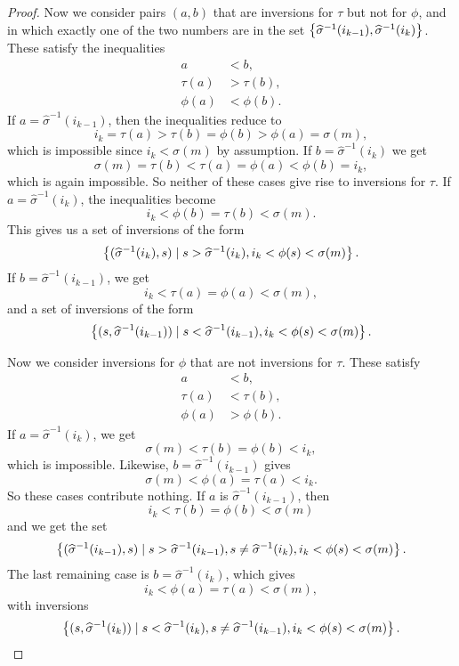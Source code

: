\begin{proof}
  Now we consider
  pairs $(a,b)$ that are inversions for $\tau$ but not for $\phi$, and
  in which exactly one of the two numbers are in the set
  $\left\{ \widehat{\sigma}^{-1}(i_{k-1}),\widehat{\sigma}^{-1}(i_{k}) \right\}$.
  These satisfy the inequalities
  \begin{align*}
    a &< b, \\
    \tau(a) &> \tau(b), \\
    \phi(a) &< \phi(b).
  \end{align*}
  If $a = \widehat{\sigma}^{-1}(i_{k-1})$, then the inequalities
  reduce to
  \[ i_k = \tau(a) > \tau(b) = \phi(b) > \phi(a) = \sigma(m), \]
  which is impossible since $i_k < \sigma(m)$ by assumption.
  If $b = \widehat{\sigma}^{-1}(i_{k})$ we get
  \[ \sigma(m) = \tau(b) < \tau(a) = \phi(a) < \phi(b) = i_k, \]
  which is again impossible. So neither of these cases give rise to
  inversions for $\tau$.
  If $a = \widehat{\sigma}^{-1}(i_{k})$, the inequalities become
  \[ i_k < \phi(b) = \tau(b) < \sigma(m). \]
  This gives us a set of inversions of the form
  \[ \left\{ (\widehat{\sigma}^{-1}(i_{k}),s) \mid s >
    \widehat{\sigma}^{-1}(i_{k}), i_k < \phi(s) < \sigma(m) \right\}. \]
  If $b = \widehat{\sigma}^{-1}(i_{k-1})$, we get
  \[ i_k < \tau(a) = \phi(a) < \sigma(m), \]
  and a set of inversions of the form
  \[ \left\{ (s,\widehat{\sigma}^{-1}(i_{k-1})) \mid s <
    \widehat{\sigma}^{-1}(i_{k-1}), i_k < \phi(s) < \sigma(m) \right\}. \]

  Now we consider inversions for $\phi$ that are not inversions for
  $\tau$. These satisfy
  \begin{align*}
    a &< b, \\
    \tau(a) &< \tau(b), \\
    \phi(a) &> \phi(b).
  \end{align*}
  If $a = \widehat{\sigma}^{-1}(i_{k})$, we get
  \[ \sigma(m) < \tau(b) = \phi(b) < i_k, \]
  which is impossible. Likewise, $b = \widehat{\sigma}^{-1}(i_{k-1})$
  gives
  \[ \sigma(m) < \phi(a) = \tau(a) < i_k. \]
  So these cases contribute nothing. If $a$ is
  $\widehat{\sigma}^{-1}(i_{k-1})$, then
  \[ i_k < \tau(b) = \phi(b) < \sigma(m) \]
  and we get the set
  \[ \left\{ (\widehat{\sigma}^{-1}(i_{k-1}),s) \mid s >
    \widehat{\sigma}^{-1}(i_{k-1}), s \neq
    \widehat{\sigma}^{-1}(i_{k}), i_k < \phi(s) < \sigma(m) \right\}. \]
  The last remaining case is $b = \widehat{\sigma}^{-1}(i_{k})$, which
  gives
  \[ i _k < \phi(a) = \tau(a) < \sigma(m), \]
  with inversions
  \[ \left\{  (s,\widehat{\sigma}^{-1}(i_{k})) \mid s <
    \widehat{\sigma}^{-1}(i_{k}), s \neq
    \widehat{\sigma}^{-1}(i_{k-1}), i_k < \phi(s) < \sigma(m)  \right\}. \]
  

\end{proof}
